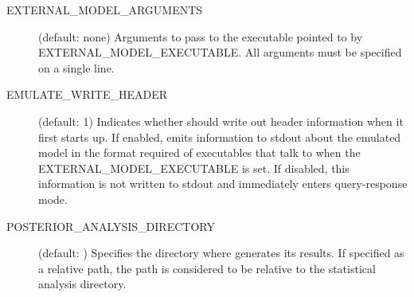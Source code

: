 \begin{description}
    \item[EXTERNAL\_MODEL\_ARGUMENTS] (default: none) Arguments to pass to the executable pointed to by EXTERNAL\_MODEL\_EXECUTABLE. All arguments must be specified on a single line.

    \item[EMULATE\_WRITE\_HEADER] (default: 1) Indicates whether  should write out header information when it first starts up. If enabled, emits information to stdout about the emulated model in the format required of executables that talk to  when the EXTERNAL\_MODEL\_EXECUTABLE is set. If disabled, this information is not written to stdout and  immediately enters query-response mode.

    \item[POSTERIOR\_ANALYSIS\_DIRECTORY] (default: ) Specifies the directory where  generates its results. If specified as a relative path, the path is considered to be relative to the statistical analysis directory.
\end{description}

